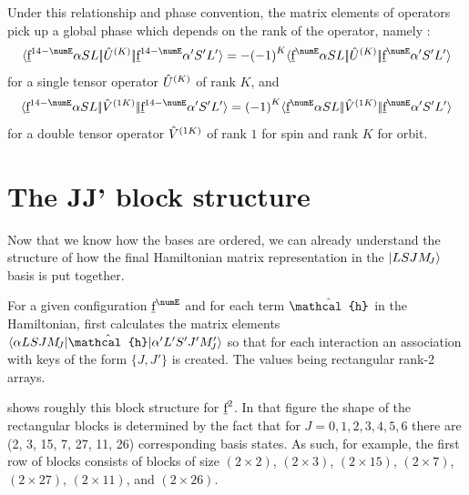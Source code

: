 \documentclass{article}
\begin{document}
Under this relationship and phase convention, the matrix elements of operators pick up a global phase which depends on the rank of the operator, namely \cite{nielson_spectroscopic_1963}:
\begin{equation}
\redbraopket{\forb^{14-\numE}\alpha{SL}}{\op{U}^{(K)}}{\forb^{14-\numE}\alpha'{S'L'}} = -\phaser{K} \redbraopket{\forb^{\numE}\alpha{SL}}{\op{U}^{(K)}}{\forb^{\numE}\alpha'{S'L'}}
\label{eqn:sign change tensor op}
\end{equation}
for a single tensor operator $\hat{U}^{(K)}$ of rank $K$, and
\begin{equation}
\redbraopket{\forb^{14-\numE}\alpha{SL}}{\op{V}^{(1K)}}{\forb^{14-\numE}\alpha'{S'L'}} = \phaser{K} \redbraopket{\forb^{\numE}\alpha{SL}}{\op{V}^{(1K)}}{\forb^{\numE}\alpha'{S'L'}}
\label{eqn:sign change double tensor op}
\end{equation}
for a double tensor operator $\hat{V}^{(1K)}$ of rank $1$ for spin and rank $K$ for orbit.

\section{The JJ' block structure}

Now that we know how the bases are ordered, we can already understand the structure of how the final Hamiltonian matrix representation in the $|LSJM_{\!{J}}\rangle$ basis is put together.

For a given configuration $\forb^\numE$ and for each term $\op{\mathcal{h}}$ in the Hamiltonian, \qlanth first calculates the matrix elements $\braopket{\alpha L S J \Msub{J}}{\op{\mathcal{h}}}{\alpha' L' S' J' \Msub{J}'}$ so that for each interaction an association with keys of the form $\{J, J'\}$ is created. The values being rectangular rank-2 arrays.

 shows roughly this block structure for $\underbar{$\text{f}$}^2$. In that figure the shape of the rectangular blocks is determined by the fact that for $J=0,1,2,3,4,5,6$ there are (2, 3, 15, 7, 27, 11, 26) corresponding basis states. As such, for example, the first row of blocks consists of blocks of size $(2\times{2})$, $(2\times{3})$, $(2\times{15})$, $(2\times{7})$, $(2\times{27})$, $(2\times{11})$, and $(2\times{26})$.
\end{document}
